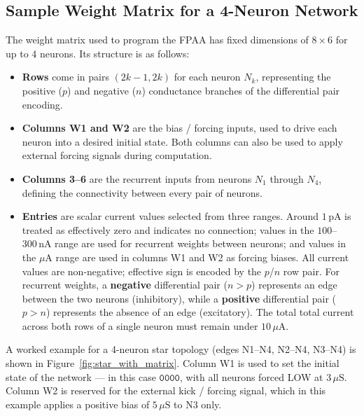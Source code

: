 \documentclass[12pt, letterpaper]{article}
\begin{document}
\subsection{Sample Weight Matrix for a 4-Neuron Network}

The weight matrix used to program the FPAA has fixed dimensions of $8 \times 6$ for up
to 4 neurons. Its structure is as follows:

\begin{itemize}
  \item \textbf{Rows} come in pairs $(2k{-}1, 2k)$ for each neuron $N_k$, representing
  the positive ($p$) and negative ($n$) conductance branches of the differential pair
  encoding.

  \item \textbf{Columns W1 and W2} are the bias / forcing inputs, used to drive each
  neuron into a desired initial state. Both columns can also be used to apply external
  forcing signals during computation.

  \item \textbf{Columns 3--6} are the recurrent inputs from neurons $N_1$ through
  $N_4$, defining the connectivity between every pair of neurons.

  \item \textbf{Entries} are scalar current values selected from three ranges.
  Around $1\,\text{pA}$ is treated as effectively zero and indicates no connection;
  values in the $100$--$300\,\text{nA}$ range are used for recurrent weights between
  neurons; and values in the $\mu\text{A}$ range are used in columns W1 and W2 as
  forcing biases. All current values are non-negative; effective sign is encoded by
  the $p$/$n$ row pair. For recurrent weights, a \textbf{negative} differential pair
  ($n > p$) represents an edge between the two neurons (inhibitory), while a
  \textbf{positive} differential pair ($p > n$) represents the absence of an edge
  (excitatory). The total total current across both rows of a single neuron must remain
  under $10\,\mu\text{A}$.
\end{itemize}

A worked example for a 4-neuron star topology (edges N1--N4, N2--N4, N3--N4) is shown
in Figure~\ref{fig:star_with_matrix}. Column W1 is used to set the initial state of the
network --- in this case $\texttt{0000}$, with all neurons forced LOW at
$3\,\mu\text{S}$. Column W2 is reserved for the external kick / forcing signal, which
in this example applies a positive bias of $5\,\mu\text{S}$ to N3 only.
\end{document}
